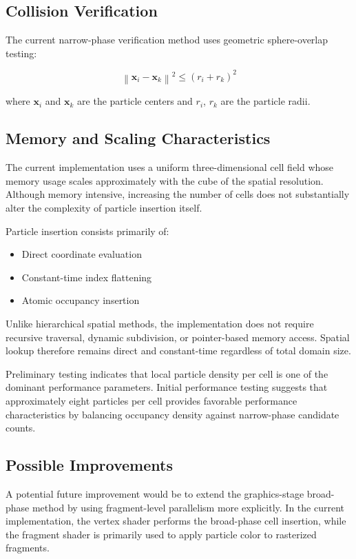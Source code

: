 \documentclass{article}
\begin{document}
\subsection{Collision Verification}

The current narrow-phase verification method uses geometric sphere-overlap testing:

\[
\left\|\mathbf{x}_i - \mathbf{x}_k\right\|^2
\leq
\left(r_i + r_k\right)^2
\]

where \(\mathbf{x}_i\) and \(\mathbf{x}_k\) are the particle centers and \(r_i\), \(r_k\) are the particle radii.

\subsection{Memory and Scaling Characteristics}

The current implementation uses a uniform three-dimensional cell field whose memory usage scales approximately with the cube of the spatial resolution. Although memory intensive, increasing the number of cells does not substantially alter the complexity of particle insertion itself.

Particle insertion consists primarily of:

\begin{itemize}
    \item Direct coordinate evaluation
    \item Constant-time index flattening
    \item Atomic occupancy insertion
\end{itemize}

Unlike hierarchical spatial methods, the implementation does not require recursive traversal, dynamic subdivision, or pointer-based memory access. Spatial lookup therefore remains direct and constant-time regardless of total domain size.

Preliminary testing indicates that local particle density per cell is one of the dominant performance parameters. Initial performance testing suggests that approximately eight particles per cell provides favorable performance characteristics by balancing occupancy density against narrow-phase candidate counts.


\subsection{Possible Improvements}

A potential future improvement would be to extend the graphics-stage broad-phase method by using fragment-level parallelism more explicitly. In the current implementation, the vertex shader performs the broad-phase cell insertion, while the fragment shader is primarily used to apply particle color to rasterized fragments.
\end{document}
